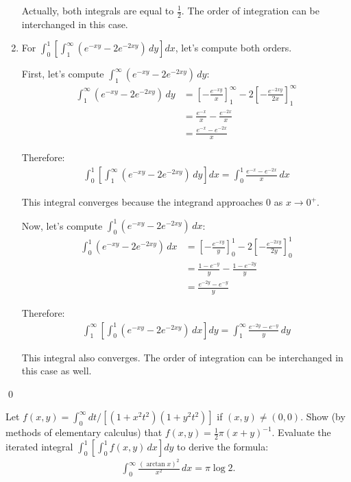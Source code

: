 \begin{enumerate}[label=(\alph*)]
Actually, both integrals are equal to $\frac{1}{2}$. The order of integration can be interchanged in this case.

\item For $\int_{0}^{1} \left[ \int_{1}^{\infty} (e^{-xy} - 2e^{-2xy}) \, dy \right] dx$, let's compute both orders.

First, let's compute $\int_{1}^{\infty} (e^{-xy} - 2e^{-2xy}) \, dy$:
\begin{align*}
\int_{1}^{\infty} (e^{-xy} - 2e^{-2xy}) \, dy &= \left[-\frac{e^{-xy}}{x}\right]_{1}^{\infty} - 2\left[-\frac{e^{-2xy}}{2x}\right]_{1}^{\infty} \\
&= \frac{e^{-x}}{x} - \frac{e^{-2x}}{x} \\
&= \frac{e^{-x} - e^{-2x}}{x}
\end{align*}

Therefore:
\begin{align*}
\int_{0}^{1} \left[ \int_{1}^{\infty} (e^{-xy} - 2e^{-2xy}) \, dy \right] dx = \int_{0}^{1} \frac{e^{-x} - e^{-2x}}{x} \, dx
\end{align*}

This integral converges because the integrand approaches 0 as $x \to 0^+$.

Now, let's compute $\int_{0}^{1} (e^{-xy} - 2e^{-2xy}) \, dx$:
\begin{align*}
\int_{0}^{1} (e^{-xy} - 2e^{-2xy}) \, dx &= \left[-\frac{e^{-xy}}{y}\right]_{0}^{1} - 2\left[-\frac{e^{-2xy}}{2y}\right]_{0}^{1} \\
&= \frac{1 - e^{-y}}{y} - \frac{1 - e^{-2y}}{y} \\
&= \frac{e^{-2y} - e^{-y}}{y}
\end{align*}

Therefore:
\begin{align*}
\int_{1}^{\infty} \left[ \int_{0}^{1} (e^{-xy} - 2e^{-2xy}) \, dx \right] dy = \int_{1}^{\infty} \frac{e^{-2y} - e^{-y}}{y} \, dy
\end{align*}

This integral also converges. The order of integration can be interchanged in this case as well.
\end{enumerate}\qed


\begin{problembox}
Let $f(x, y) = \int_{0}^{\infty} dt / [(1 + x^{2}t^{2})(1 + y^{2}t^{2})]$ if $(x, y) \neq (0, 0)$. Show (by methods of elementary calculus) that $f(x, y) = \frac{1}{2}\pi(x + y)^{-1}$. Evaluate the iterated integral $\int_{0}^{1} \left[ \int_{0}^{1} f(x, y) \, dx \right] dy$ to derive the formula:
\begin{align*}
\int_{0}^{\infty} \frac{(\arctan x)^{2}}{x^{2}} \, dx = \pi \log 2.
\end{align*}
\end{problembox}

